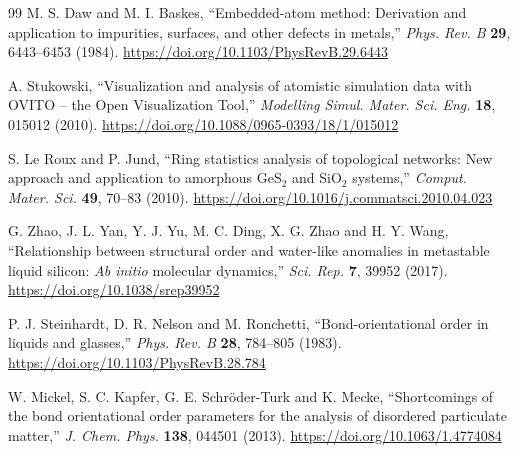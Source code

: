 \documentclass{article}
\begin{document}
\begin{thebibliography}{99}
 M. S. Daw and M. I. Baskes, ``Embedded-atom method: Derivation
    and application to impurities, surfaces, and other defects in metals,''
    \textit{Phys. Rev. B} \textbf{29}, 6443--6453 (1984).
    \url{https://doi.org/10.1103/PhysRevB.29.6443}

 A. Stukowski, ``Visualization and analysis of atomistic simulation
    data with OVITO -- the Open Visualization Tool,'' \textit{Modelling Simul.
    Mater. Sci. Eng.} \textbf{18}, 015012 (2010).
    \url{https://doi.org/10.1088/0965-0393/18/1/015012}

 S. Le Roux and P. Jund, ``Ring statistics analysis of topological
    networks: New approach and application to amorphous GeS$_2$ and SiO$_2$
    systems,'' \textit{Comput. Mater. Sci.} \textbf{49}, 70--83 (2010).
    \url{https://doi.org/10.1016/j.commatsci.2010.04.023}

 G. Zhao, J. L. Yan, Y. J. Yu, M. C. Ding, X. G. Zhao and
    H. Y. Wang, ``Relationship between structural order and water-like anomalies
    in metastable liquid silicon: \textit{Ab initio} molecular dynamics,''
    \textit{Sci. Rep.} \textbf{7}, 39952 (2017).
    \url{https://doi.org/10.1038/srep39952}

 P. J. Steinhardt, D. R. Nelson and M. Ronchetti,
    ``Bond-orientational order in liquids and glasses,'' \textit{Phys. Rev. B}
    \textbf{28}, 784--805 (1983). \url{https://doi.org/10.1103/PhysRevB.28.784}

 W. Mickel, S. C. Kapfer, G. E. Schröder-Turk and K. Mecke,
    ``Shortcomings of the bond orientational order parameters for the analysis of
    disordered particulate matter,'' \textit{J. Chem. Phys.} \textbf{138}, 044501
    (2013). \url{https://doi.org/10.1063/1.4774084}

\end{thebibliography}
\end{document}

